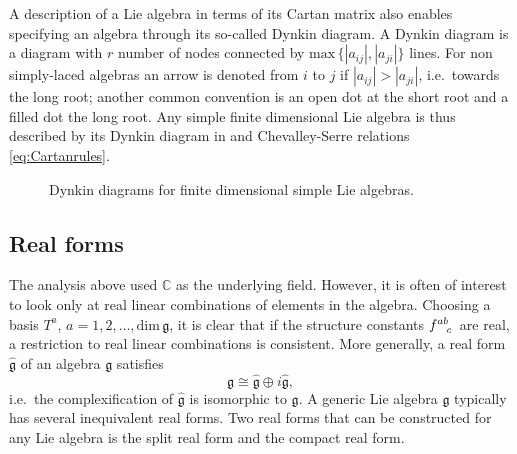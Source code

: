 A description of a Lie algebra in terms of its Cartan matrix also enables specifying an algebra through its so-called Dynkin diagram. A Dynkin diagram is a diagram with $r$ number of nodes connected by $\text{max}\,\{|a_{ij}|,|a_{ji}|\}$ lines. For non simply-laced algebras an arrow is denoted from $i$ to $j$ if $|a_{ij}|>|a_{ji}|$, i.e.\ towards the long root; another common convention is an open dot at the short root and a filled dot the long root. Any simple finite dimensional Lie algebra is thus described by its Dynkin diagram in  and Chevalley-Serre relations \eqref{eq:Cartanrules}.
\begin{figure}
    \centering
    \AllDynkin
    \caption{Dynkin diagrams for finite dimensional simple Lie algebras.}
    \label{fig:AllDynkin}
\end{figure}



\subsection{Real forms}
The analysis above used $\mathbb{C}$ as the underlying field. However, it is often of interest to look only at real linear combinations of elements in the algebra. Choosing a basis $T^a$, $a=1,2,\ldots, \text{dim}\,\mathfrak{g}$, it is clear that if the structure constants $\tensor{f}{^{ab}_c}$ are real, a restriction to real linear combinations is consistent. More generally, a real form $\hat{\mathfrak{g}}$ of an algebra $\mathfrak{g}$ satisfies
\begin{equation}
    \mathfrak{g} \cong \hat{\mathfrak{g}}\oplus i\hat{\mathfrak{g}},
\end{equation}
i.e.\ the complexification of $\hat{\mathfrak{g}}$ is isomorphic to $\mathfrak{g}$. A generic Lie algebra $\mathfrak{g}$ typically has several inequivalent real forms. Two real forms that can be constructed for any Lie algebra is the split real form and the compact real form.

